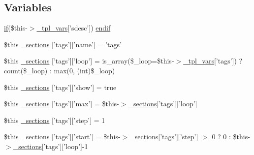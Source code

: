 \subsection*{\-Variables}
\begin{DoxyCompactItemize}
\item 
\hyperlink{_setup_8inc_8php_ad0184337b31d13763ec8751feff4aabe}{if}(\$this-\/$>$\hyperlink{_06_06127_05_06_0612781687_05pkgelementindex_8tpl_8php_a4a4846d8e68d455590131a05697f67a3}{\-\_\-tpl\-\_\-vars}\mbox{[}'sdesc'\mbox{]}) \hyperlink{34d6fa4bfd5eef6424a9ddc74a166350_2_06_06972_05_06_06972954595_05docblock_8tpl_8php_a82cd33ca97ff99f2fcc5e9c81d65251b}{endif}
\item 
\$this \hyperlink{34d6fa4bfd5eef6424a9ddc74a166350_2_06_06972_05_06_06972954595_05docblock_8tpl_8php_aa1e572bb7d05e8a2142a85be7b8a87b5}{\-\_\-sections} \mbox{[}'tags'\mbox{]}\mbox{[}'name'\mbox{]} = 'tags'
\item 
\$this \hyperlink{34d6fa4bfd5eef6424a9ddc74a166350_2_06_06972_05_06_06972954595_05docblock_8tpl_8php_a410d383544f232c66ea48cc29cdc5bfa}{\-\_\-sections} \mbox{[}'tags'\mbox{]}\mbox{[}'loop'\mbox{]} = is\-\_\-array(\$\-\_\-loop=\$this-\/$>$\hyperlink{_06_06127_05_06_0612781687_05pkgelementindex_8tpl_8php_a4a4846d8e68d455590131a05697f67a3}{\-\_\-tpl\-\_\-vars}\mbox{[}'tags'\mbox{]}) ? count(\$\-\_\-loop) \-: max(0, (int)\$\-\_\-loop)
\item 
\$this \hyperlink{34d6fa4bfd5eef6424a9ddc74a166350_2_06_06972_05_06_06972954595_05docblock_8tpl_8php_ac42ff4c76eabf3cabe7157d354e07ad8}{\-\_\-sections} \mbox{[}'tags'\mbox{]}\mbox{[}'show'\mbox{]} = true
\item 
\$this \hyperlink{34d6fa4bfd5eef6424a9ddc74a166350_2_06_06972_05_06_06972954595_05docblock_8tpl_8php_acf5abc1846c453fa04864a654b69ce2c}{\-\_\-sections} \mbox{[}'tags'\mbox{]}\mbox{[}'max'\mbox{]} = \$this-\/$>$\hyperlink{_06_06127_05_06_0612781687_05pkgelementindex_8tpl_8php_a9e3d26b39edfe29c3f29b8035ef33828}{\-\_\-sections}\mbox{[}'tags'\mbox{]}\mbox{[}'loop'\mbox{]}
\item 
\$this \hyperlink{34d6fa4bfd5eef6424a9ddc74a166350_2_06_06972_05_06_06972954595_05docblock_8tpl_8php_a47209f3eb9ee860dbeacf69dc38f5e5a}{\-\_\-sections} \mbox{[}'tags'\mbox{]}\mbox{[}'step'\mbox{]} = 1
\item 
\$this \hyperlink{34d6fa4bfd5eef6424a9ddc74a166350_2_06_06972_05_06_06972954595_05docblock_8tpl_8php_a7f087a93e0a027583a7dd0699bce1b9d}{\-\_\-sections} \mbox{[}'tags'\mbox{]}\mbox{[}'start'\mbox{]} = \$this-\/$>$\hyperlink{_06_06127_05_06_0612781687_05pkgelementindex_8tpl_8php_a9e3d26b39edfe29c3f29b8035ef33828}{\-\_\-sections}\mbox{[}'tags'\mbox{]}\mbox{[}'step'\mbox{]} $>$ 0 ? 0 \-: \$this-\/$>$\hyperlink{_06_06127_05_06_0612781687_05pkgelementindex_8tpl_8php_a9e3d26b39edfe29c3f29b8035ef33828}{\-\_\-sections}\mbox{[}'tags'\mbox{]}\mbox{[}'loop'\mbox{]}-\/1

\end{DoxyCompactItemize}
